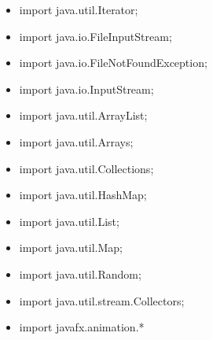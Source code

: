 \documentclass[conference]{IEEEtran}
\begin{document}
\begin{itemize}
    \item import java.util.Iterator;
    \item import java.io.FileInputStream;
    \item import java.io.FileNotFoundException;
    \item import java.io.InputStream;
    \item import java.util.ArrayList;
    \item import java.util.Arrays;
    \item import java.util.Collections;
    \item import java.util.HashMap;
    \item import java.util.List;
    \item import java.util.Map;
    \item import java.util.Random;
    \item import java.util.stream.Collectors;
    \item import javafx.animation.*
\end{itemize}
\end{document}
